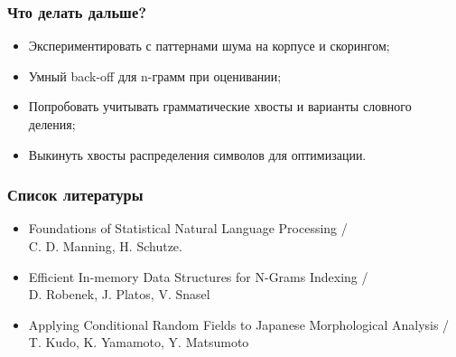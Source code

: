 \documentclass[14pt]{beamer}
\begin{document}
\begin{frame}
\frametitle{Что делать дальше?}
\begin{itemize}
  \item Экспериментировать с паттернами шума на корпусе и скорингом;
  \item Умный back-off для n-грамм при оценивании;
  \item Попробовать учитывать грамматические хвосты и варианты словного деления;
  \item Выкинуть хвосты распределения символов для оптимизации.
\end{itemize}
\end{frame}

\begin{frame}
\frametitle{Список литературы}
\footnotesize{
\begin{itemize}
  \item Foundations of Statistical Natural Language Processing / \\C. D. Manning, H. Schutze.
  \item Efficient In-memory Data Structures for N-Grams Indexing / \\D. Robenek, J. Platos, V. Snasel
  \item Applying Conditional Random Fields to Japanese Morphological Analysis / T. Kudo, K. Yamamoto, Y. Matsumoto
\end{itemize}}
\end{frame}


\begin{frame}
\end{frame}
\end{document}
